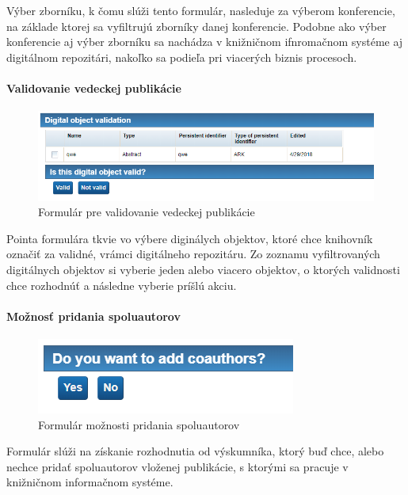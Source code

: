 \documentclass[10pt,oneside,slovak,a4paper]{article}
\begin{document}
Výber zborníku, k čomu slúži tento formulár, nasleduje za výberom konferencie, na základe ktorej sa vyfiltrujú zborníky danej konferencie. Podobne ako výber konferencie aj výber zborníku sa nachádza v knižničnom ifnromačnom systéme aj digitálnom repozitári, nakoľko sa podieľa pri viacerých biznis procesoch.

\paragraph{Validovanie vedeckej publikácie}

\begin{figure} [H]
\centering
\includegraphics[scale=0.4]{forms/Coachforvalidatingpublication.png} 
\caption{Formulár pre validovanie vedeckej publikácie}
\end{figure}

Pointa formulára tkvie vo výbere diginálych objektov, ktoré chce knihovník označiť za validné, vrámci digitálneho repozitáru. Zo zoznamu vyfiltrovaných digitálnych objektov si vyberie jeden alebo viacero objektov, o ktorých validnosti chce rozhodnúť a následne vyberie príšlú akciu.

\paragraph{Možnosť pridania spoluautorov}

\begin{figure} [H]
\centering
\includegraphics[scale=0.4]{forms/Coachchoicetoaddcouthors.png} 
\caption{Formulár možnosti pridania spoluautorov}
\end{figure}

Formulár slúži na získanie rozhodnutia od výskumníka, ktorý buď chce, alebo nechce pridať spoluautorov vloženej publikácie, s ktorými sa pracuje v knižničnom informačnom systéme.
\end{document}
